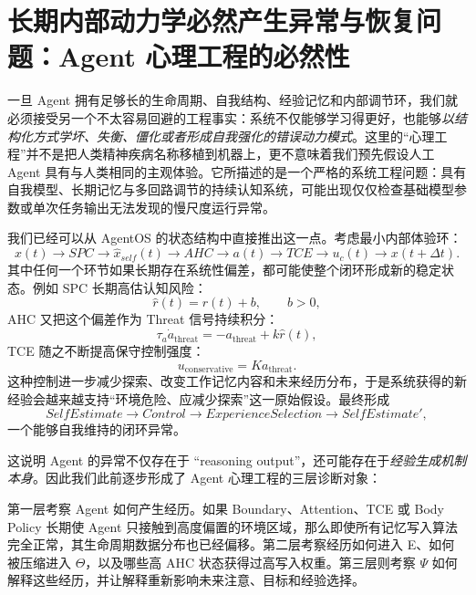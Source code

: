 \section{长期内部动力学必然产生异常与恢复问题：Agent 心理工程的必然性}

一旦 Agent 拥有足够长的生命周期、自我结构、经验记忆和内部调节环，我们就必须接受另一个不太容易回避的工程事实：系统不仅能够学习得更好，也能够\emph{以结构化方式学坏、失衡、僵化或者形成自我强化的错误动力模式}。这里的“心理工程”并不是把人类精神疾病名称移植到机器上，更不意味着我们预先假设人工 Agent 具有与人类相同的主观体验。它所描述的是一个严格的系统工程问题：具有自我模型、长期记忆与多回路调节的持续认知系统，可能出现仅仅检查基础模型参数或单次任务输出无法发现的慢尺度运行异常。

我们已经可以从 AgentOS 的状态结构中直接推出这一点。考虑最小内部体验环：
\[
x(t)
\rightarrow
SPC
\rightarrow
\hat{x}_{self}(t)
\rightarrow
AHC
\rightarrow
a(t)
\rightarrow
TCE
\rightarrow
u_c(t)
\rightarrow
x(t+\Delta t).
\]
其中任何一个环节如果长期存在系统性偏差，都可能使整个闭环形成新的稳定状态。例如 SPC 长期高估认知风险：
\[
\hat r(t)
=
r(t)+b,
\qquad b>0,
\]
AHC 又把这个偏差作为 Threat 信号持续积分：
\[
\tau_a\dot a_{\mathrm{threat}}
=
-a_{\mathrm{threat}}
+
k\hat r(t),
\]
TCE 随之不断提高保守控制强度：
\[
u_{\mathrm{conservative}}
=
K a_{\mathrm{threat}}.
\]
这种控制进一步减少探索、改变工作记忆内容和未来经历分布，于是系统获得的新经验会越来越支持“环境危险、应减少探索”这一原始假设。最终形成
\[
SelfEstimate
\rightarrow
Control
\rightarrow
ExperienceSelection
\rightarrow
SelfEstimate',
\]
一个能够自我维持的闭环异常。

这说明 Agent 的异常不仅存在于 ``reasoning output''，还可能存在于\emph{经验生成机制本身}。因此我们此前逐步形成了 Agent 心理工程的三层诊断对象：
\begin{statementbox}
\centering
{}
\end{statementbox}
第一层考察 Agent 如何产生经历。如果 Boundary、Attention、TCE 或 Body Policy 长期使 Agent 只接触到高度偏置的环境区域，那么即使所有记忆写入算法完全正常，其生命周期数据分布也已经偏移。第二层考察经历如何进入 E、如何被压缩进入 $\Theta$，以及哪些高 AHC 状态获得过高写入权重。第三层则考察 $\Psi$ 如何解释这些经历，并让解释重新影响未来注意、目标和经验选择。

